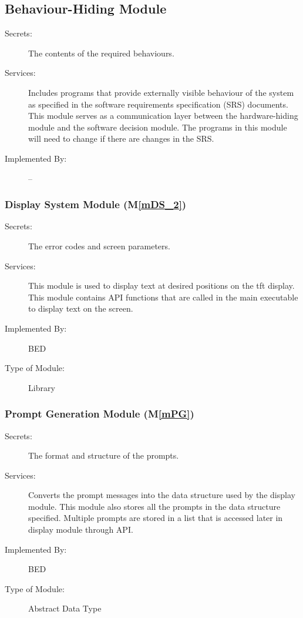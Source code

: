 \documentclass[12pt, titlepage]{article}
\newcommand{\mref}[1]{M\ref{#1}}
\begin{document}
\subsection{Behaviour-Hiding Module}

\begin{description}
  \item[Secrets:]The contents of the required behaviours.
  \item[Services:]Includes programs that provide externally visible behaviour of
  the system as specified in the software requirements specification (SRS)
  documents. This module serves as a communication layer between the
  hardware-hiding module and the software decision module. The programs in this
  module will need to change if there are changes in the SRS.
  \item[Implemented By:] --
\end{description}

\subsubsection{Display System Module (\mref{mDS_2}) }

\begin{description}
  \item[Secrets:]The error codes and screen parameters.
  \item[Services:] This module is used to display text at desired positions on the tft display.
    This module contains API functions that are called in the main executable to display text on the screen.
  \item[Implemented By:] BED
  \item[Type of Module:] Library
\end{description}

\subsubsection{Prompt Generation Module (\mref{mPG})}

\begin{description}
  \item[Secrets:]The format and structure of the prompts.
  \item[Services:] Converts the prompt messages into the data structure used by the
    display module. This module also stores all the prompts in the data structure specified. Multiple prompts are stored in a list that is accessed later in display module through API.
  \item[Implemented By:] BED
  \item[Type of Module:] Abstract Data Type
\end{description}
\end{document}
